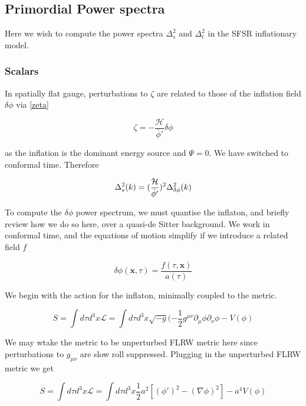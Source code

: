 \documentclass[a4paper,10pt]{article}
\renewcommand{\v}[1]{\mathbf{#1}}
\newcommand{\half}{\frac{1}{2}}
\newcommand{\bphi}{\bar{\phi}}
\begin{document}
\subsection{Primordial Power spectra}

Here we wish to compute the power spectra $\Delta^2_s$ and $\Delta^2_t$ in the SFSR inflationary model. 

\subsubsection{Scalars}

In spatially flat gauge, perturbations to $\zeta$ are related to those of the inflation field $\delta\phi$ via \ref{zeta}

\begin{equation}
\zeta = -\frac{\mathcal{H}}{\bphi'}\delta\phi
\end{equation}

as the inflation is the dominant energy source and $\Psi = 0$. We have switched to conformal time. Therefore

\begin{equation}
\Delta^2_{s}(k) =(\frac{\mathcal{H}}{\bphi'})^2\Delta^2_{\delta\phi}(k)\\
\end{equation}


To compute the $\delta\phi$ power spectrum, we must quantise the inflaton, and briefly review how we do so here, over a quasi-de Sitter background. We work in conformal time, and the equations of motion simplify if we introduce a related field $f$ 

\begin{equation}
\delta\phi(\v{x},\tau) = \frac{f(\tau, \v{x})}{a(\tau)}
\label{phiexpand}
\end{equation}

We begin with the action for the inflaton, minimally coupled to the metric.

\begin{equation}
S =\int d\tau d^3x \mathcal{L}  =  \int d\tau d^3x \sqrt{-g} (-\half g^{\mu \nu}\partial_\mu \phi\partial_\nu \phi - V(\phi)  
\end{equation}

We may wtake the metric to be unperturbed FLRW metric here since perturbations to $g_{\mu\nu}$ are slow roll suppressed. Plugging in the unperturbed FLRW metric we get 

\begin{equation}
S = \int d\tau d^3x \mathcal{L}  = \int d\tau d^3x \half a^2 [(\phi ' )^2 -(\nabla \phi)^2]-a^4V(\phi)
\label{scalarfieldaction}
\end{equation}
\end{document}
